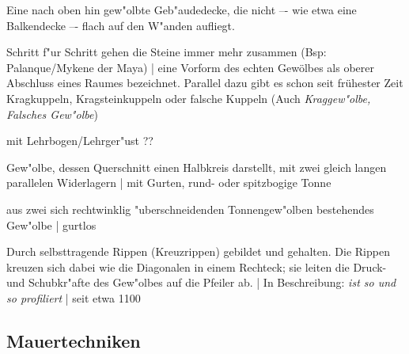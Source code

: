 \documentclass[emulatestandardclasses]{scrartcl}
\begin{document}
\begin{description}[leftmargin=!,labelwidth=\widthof{\bfseries Kreuzrippengew"olbe}]
  \item[Gew"olbe] Eine nach oben hin gew"olbte Geb"audedecke, die nicht –- wie etwa eine Balkendecke –- flach auf den W"anden aufliegt.
  \item[Unechtes Gew"olbe] Schritt f"ur Schritt gehen die Steine immer mehr zusammen (Bsp: Palanque/Mykene der Maya) | eine Vorform des echten Gewölbes als oberer Abschluss eines Raumes bezeichnet. Parallel dazu gibt es schon seit frühester Zeit Kragkuppeln, Kragsteinkuppeln oder falsche Kuppeln (Auch \emph{Kraggew"olbe, Falsches Gew"olbe})
  \item[W"olbung] mit Lehrbogen/Lehrger"ust ??
  \item[Tonnengew"olbe] Gew"olbe, dessen Querschnitt einen Halbkreis darstellt, mit zwei gleich langen parallelen Widerlagern | mit Gurten, rund- oder spitzbogige Tonne
  \item[Kreuzgratgew"olbe] aus zwei sich rechtwinklig "uberschneidenden Tonnengew"olben bestehendes Gew"olbe | gurtlos
  \item[Kreuzrippengew"olbe] Durch selbsttragende Rippen (Kreuzrippen) gebildet und gehalten. Die Rippen kreuzen sich dabei wie die Diagonalen in einem Rechteck; sie leiten die Druck- und Schubkr"afte des Gew"olbes auf die Pfeiler ab. | In Beschreibung: \emph{ist so und so profiliert} | seit etwa 1100 
\end{description}

\subsection{Mauertechniken}
\end{document}
